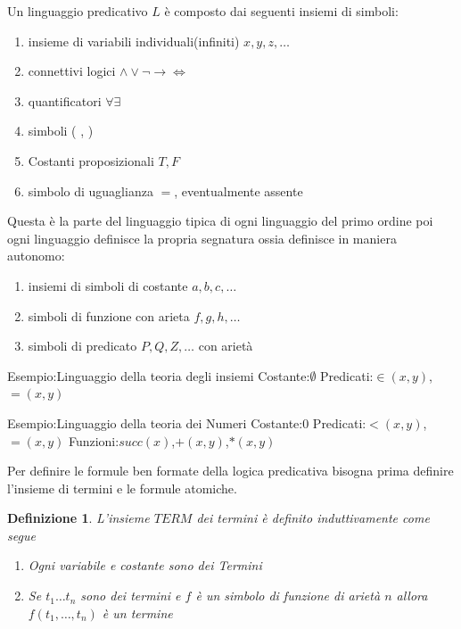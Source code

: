 \documentclass[a4paper]{report}
\newtheorem{defi}{Definizione}%
\begin{document}
Un linguaggio predicativo $L$ è composto dai seguenti insiemi di simboli:
\begin{enumerate}
    \item insieme di variabili individuali(infiniti) $x,y,z,\dots$
    \item connettivi logici $\land \lor \neg \rightarrow \iff$
    \item quantificatori  $\forall \exists$
    \item simboli ( , )
    \item Costanti proposizionali $T,F$
    \item simbolo di uguaglianza $=$, eventualmente assente
\end{enumerate}
Questa è la parte del linguaggio tipica di ogni linguaggio del primo ordine poi
ogni linguaggio definisce la propria segnatura ossia definisce in maniera autonomo:
\begin{enumerate}
    \item insiemi di simboli di costante $a,b,c,\dots$
    \item simboli di funzione con arieta $f,g,h,\dots$
    \item simboli di predicato $P,Q,Z,\dots$ con arietà
\end{enumerate}

Esempio:Linguaggio della teoria degli insiemi \newline
Costante:$\emptyset$\newline
Predicati:$\in(x,y)$, $=(x,y)$

Esempio:Linguaggio della teoria dei Numeri \newline
Costante:$0$ \newline
Predicati:$<(x,y)$,$=(x,y)$ \newline
Funzioni:$succ(x)$,$+(x,y)$,$*(x,y)$

Per definire le formule ben formate della logica predicativa bisogna prima definire
l'insieme di termini e le formule atomiche.

\begin{defi}
    L'insieme $TERM$ dei termini è definito induttivamente come segue
    \begin{enumerate}
        \item Ogni variabile e costante sono dei Termini
        \item Se $t_1 \dots t_n$ sono dei termini e $f$ è un simbolo di funzione di arietà $n$
              allora $f(t_1,\dots,t_n)$ è un termine
    \end{enumerate}
\end{defi}
\end{document}
